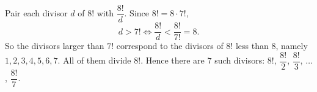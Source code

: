 Pair each divisor $d$ of $8!$ with $\dfrac{8!}{d}$. Since $8!=8\cdot7!$,
\[
d>7!\iff\dfrac{8!}{d}<\dfrac{8!}{7!}=8 .
\]
So the divisors larger than $7!$ correspond to the divisors of $8!$ less than $8$, namely $1,2,3,4,5,6,7$. All of them divide $8!$. Hence there are $\boxed{7}$ such divisors: $8!$, $\dfrac{8!}{2}$, $\dfrac{8!}{3}$, $\dots$, $\dfrac{8!}{7}$.
